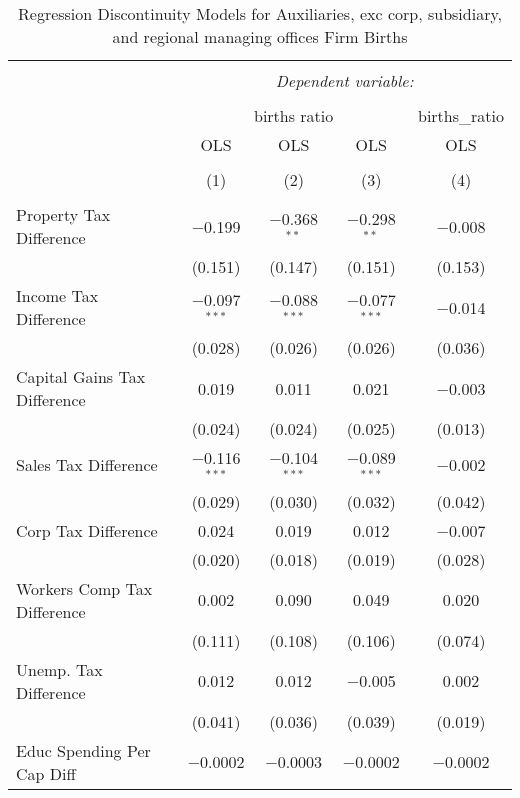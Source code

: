 
\begin{table}[!htbp] \centering 
  \caption{Regression Discontinuity Models for  Auxiliaries, exc corp, subsidiary, and regional managing offices Firm Births} 
  \label{95rd} 
\begin{tabular}{@{\extracolsep{5pt}}lcccc} 
\\[-1.8ex]\hline 
\hline \\[-1.8ex] 
 & \multicolumn{4}{c}{\textit{Dependent variable:}} \\ 
\cline{2-5} 
\\[-1.8ex] & \multicolumn{3}{c}{births ratio} & births\_ratio \\ 
 & OLS & OLS & OLS & OLS \\ 
\\[-1.8ex] & (1) & (2) & (3) & (4)\\ 
\hline \\[-1.8ex] 
 Property Tax Difference & $-$0.199 & $-$0.368$^{**}$ & $-$0.298$^{**}$ & $-$0.008 \\ 
  & (0.151) & (0.147) & (0.151) & (0.153) \\ 
  Income Tax Difference & $-$0.097$^{***}$ & $-$0.088$^{***}$ & $-$0.077$^{***}$ & $-$0.014 \\ 
  & (0.028) & (0.026) & (0.026) & (0.036) \\ 
  Capital Gains Tax Difference & 0.019 & 0.011 & 0.021 & $-$0.003 \\ 
  & (0.024) & (0.024) & (0.025) & (0.013) \\ 
  Sales Tax Difference & $-$0.116$^{***}$ & $-$0.104$^{***}$ & $-$0.089$^{***}$ & $-$0.002 \\ 
  & (0.029) & (0.030) & (0.032) & (0.042) \\ 
  Corp Tax Difference & 0.024 & 0.019 & 0.012 & $-$0.007 \\ 
  & (0.020) & (0.018) & (0.019) & (0.028) \\ 
  Workers Comp Tax Difference & 0.002 & 0.090 & 0.049 & 0.020 \\ 
  & (0.111) & (0.108) & (0.106) & (0.074) \\ 
  Unemp. Tax Difference & 0.012 & 0.012 & $-$0.005 & 0.002 \\ 
  & (0.041) & (0.036) & (0.039) & (0.019) \\ 
  Educ Spending Per Cap Diff & $-$0.0002 & $-$0.0003 & $-$0.0002 & $-$0.0002 \\ 

\end{tabular}
\end{table}

